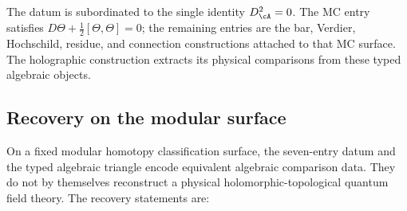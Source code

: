 The datum is subordinated to the single identity $D_\cA^2 = 0$. The
MC entry satisfies
$D\Theta + \frac{1}{2}[\Theta,\Theta] = 0$; the remaining entries are
the bar, Verdier, Hochschild, residue, and connection constructions
attached to that MC surface. The holographic construction extracts its
physical comparisons from these typed algebraic objects.

\subsection{Recovery on the modular surface}
\label{subsec:thqg-intro-reconstruction}

On a fixed modular homotopy classification surface, the seven-entry
datum and the typed algebraic triangle encode equivalent algebraic
comparison data. They do not by themselves reconstruct a
physical holomorphic-topological quantum field theory. The recovery
statements are:

